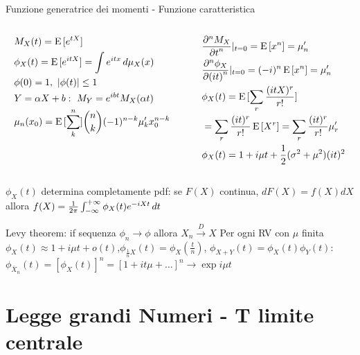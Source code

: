 \documentclass[asd-beamer.tex]{subfiles}
\begin{document}
\begin{frame}{Funzione generatrice dei momenti - Funzione caratteristica}
\begin{columns}[T]
	\begin{column}{0.4\textwidth}
		\begin{align*}
		&M_X(t)=\E{[\exp{tX}]}\\
		&\phi_X(t)=\E{[\exp{itX}]}=\int\exp{itx}\,d\mu_X(x)\\
		&\phi(0)=1,\ |\phi(t)|\leq1\\
		&Y=\alpha X+b:\ M_Y=\exp{ibt}M_X(\alpha t)\\
		&\mu_n(x_0)=\E{[\sum_k^n]}\binom{n}{k}(-1)^{n-k}\mu'_kx_0^{n-k}\\
		\end{align*}
	\end{column}
	\begin{column}{0.6\textwidth}
		\begin{align*}
		&\PDyn{t}{M_X}{n}|_{t=0}=\E{[x^n]}=\mu_n'\\
		&\PDyn{(it)}{\phi_X}{n}|_{t=0}=(-i)^n\E{[x^n]}=\mu_n'\\
		&\phi_X(t)=\E{[\sum_r\frac{(itX)^r}{r!}]}\\
		&=\sum_r\frac{(it)^r}{r!}\E{[X^r]}=\sum_r\frac{(it)^r}{r!}\mu_r'\\
		&\phi_X(t)=1+i\mu t+\frac{1}{2}(\sigma^2+\mu^2)(it)^2
		\end{align*}
	\end{column}
\end{columns}
$\phi_X(t)$ determina completamente pdf: se $F(X)$ continua, $dF(X)=f(X)dX$ allora $f(X)=\frac{1}{2\pi}\intsinf{}\phi_X(t)\exp{-iXt}\,dt$
\begin{block}{Levy theorem: if sequenza $\phi_n\to\phi$ allora $X_n\xrightarrow{D}X$}
Per ogni RV con $\mu$ finita $\phi_X(t)\approx1+i\mu t+o(t)$,$\phi_{\frac{1}{n}X}(t)=\phi_X(\frac{t}{n})$, $\phi_{X+Y}(t)=\phi_X(t)\phi_Y(t)$:
$\phi_{\overline{X}_n}(t)=[\phi_X(t)]^n=[1+it\mu+\ldots]^n\to\exp{i\mu t}$
\end{block}
\end{frame}

\section{Legge grandi Numeri - T limite centrale}
\end{document}
